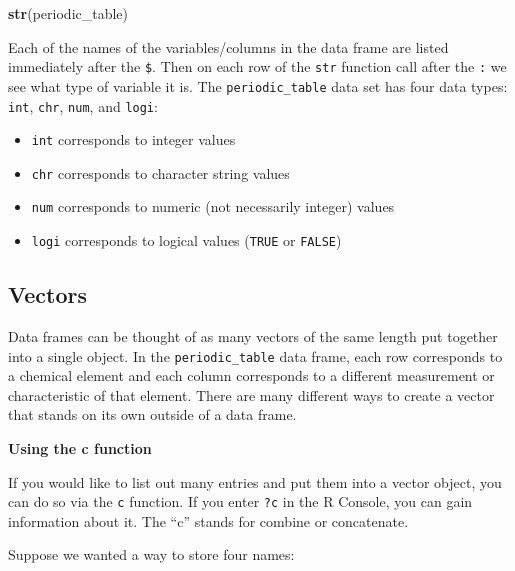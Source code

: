 \documentclass[]{tufte-book}
\newenvironment{Shaded}{\begin{snugshade}}{\end{snugshade}}
\newcommand{\KeywordTok}[1]{\textcolor[rgb]{0.13,0.29,0.53}{\textbf{#1}}}
\newcommand{\NormalTok}[1]{#1}
\providecommand{\tightlist}{%
  \setlength{\itemsep}{0pt}\setlength{\parskip}{0pt}}
\begin{document}
\begin{Shaded}
\begin{Highlighting}[]
\KeywordTok{str}\NormalTok{(periodic_table)}
\end{Highlighting}
\end{Shaded}

Each of the names of the variables/columns in the data frame are listed immediately after the \texttt{\$}. Then on each row of the \texttt{str} function call after the \texttt{:} we see what type of variable it is. The \texttt{periodic\_table} data set has four data types: \texttt{int}, \texttt{chr}, \texttt{num}, and \texttt{logi}:

\begin{itemize}
\tightlist
\item
  \texttt{int} corresponds to integer values
\item
  \texttt{chr} corresponds to character string values
\item
  \texttt{num} corresponds to numeric (not necessarily integer) values
\item
  \texttt{logi} corresponds to logical values (\texttt{TRUE} or \texttt{FALSE})
\end{itemize}

\hypertarget{vectors}{%
\subsection{Vectors}\label{vectors}}

Data frames can be thought of as many vectors of the same length put together into a single object. In the \texttt{periodic\_table} data frame, each row corresponds to a chemical element and each column corresponds to a different measurement or characteristic of that element. There are many different ways to create a vector that stands on its own outside of a data frame. \newline\vspace*{0.1in}

\vspace*{0.2in}

\noindent\textbf{Using the c function}\vspace*{0.1in}

If you would like to list out many entries and put them into a vector object, you can do so via the \texttt{c} function. If you enter \texttt{?c} in the R Console, you can gain information about it. The ``c'' stands for combine or concatenate.

Suppose we wanted a way to store four names:
\end{document}
